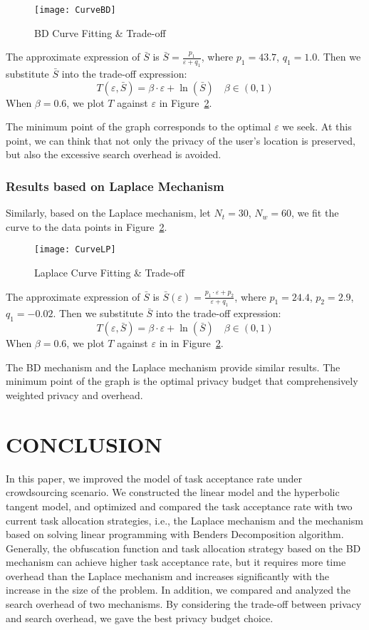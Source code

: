\begin{figure}
\texttt{[image: CurveBD]}
\caption{BD Curve Fitting \& Trade-off}
\label{img:CurveBD}
\end{figure}

The approximate expression of $\bar{S}$ is $\bar{S}=\frac{p_1}{\varepsilon + q_1}$, where $p_1=43.7$, $q_1=1.0$. Then we substitute $\bar{S}$ into the trade-off expression:
$$
	T(\varepsilon , \bar{S})=\beta \cdot \varepsilon + \ln (\bar{S}) \quad \beta \in (0,1)
$$
When $\beta=0.6$, we plot $T$ against $\varepsilon$ in Figure~\ref{img:CurveLP}.

The minimum point of the graph corresponds to the optimal $\varepsilon$ we seek. At this point, we can think that not only the privacy of the user's location is preserved, but also the excessive search overhead is avoided. 

\subsubsection{Results based on Laplace Mechanism}
Similarly, based on the Laplace mechanism, let $N_t=30$, $N_w=60$, we fit the curve to the data points in Figure~\ref{img:CurveLP}.

\begin{figure}
\texttt{[image: CurveLP]}
\caption{Laplace Curve Fitting \& Trade-off}
\label{img:CurveLP}
\end{figure}

The approximate expression of $\bar{S}$ is $\bar{S}(\varepsilon)=\frac{p_1 \cdot \varepsilon + p_2}{\varepsilon+q_1}$, where $p_1=24.4$, $p_2=2.9$, $q_1=-0.02$. Then we substitute $\bar{S}$ into the trade-off expression:
$$
	T(\varepsilon , \bar{S})=\beta \cdot \varepsilon + \ln (\bar{S}) \quad \beta \in (0,1)
$$
When $\beta=0.6$, we plot $T$ against $\varepsilon$ in in Figure~\ref{img:CurveLP}.

The BD mechanism and the Laplace mechanism provide similar results. The minimum point of the graph is the optimal privacy budget that comprehensively weighted privacy and overhead.

\section{CONCLUSION} %
In this paper, we improved the model of task acceptance rate under crowdsourcing scenario. We constructed the linear model and the hyperbolic tangent model, and optimized and compared the task acceptance rate with two current task allocation strategies, i.e., the Laplace mechanism and the mechanism based on solving linear programming with Benders Decomposition algorithm. Generally, the obfuscation function and task allocation strategy based on the BD mechanism can achieve higher task acceptance rate, but it requires more time overhead than the Laplace mechanism and increases significantly with the increase in the size of the problem. In addition, we compared and analyzed the search overhead of two mechanisms. By considering the trade-off between privacy and search overhead, we gave the best privacy budget choice.
